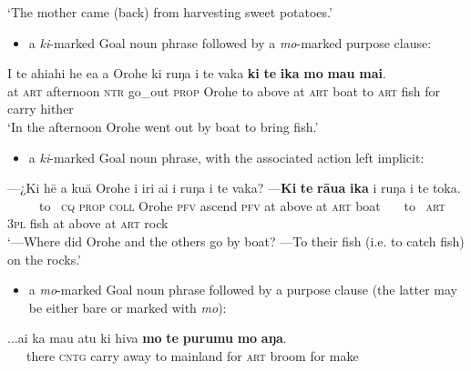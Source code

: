 \glt
‘The mother came (back) from harvesting sweet potatoes.’ \textstyleExampleref{[MsE-094.006]}
\z

\begin{itemize}
\item 
a \textit{ki}{}-marked Goal noun phrase followed by a \textit{mo}{}-marked purpose clause:
\end{itemize}

\ea\label{ex:11.251}
\gll {\ꞌ}I te ahiahi he e{\ꞌ}a a {\ꞌ}Orohe ki ruŋa i te vaka  \textbf{ki} \textbf{te} \textbf{ika} \textbf{mo} \textbf{ma{\ꞌ}u} \textbf{mai}.\\
at \textsc{art} afternoon \textsc{ntr} go\_out \textsc{prop} Orohe to above at \textsc{art} boat  to \textsc{art} fish for carry hither\\

\glt
‘In the afternoon Orohe went out by boat to bring fish.’ \textstyleExampleref{[R160.005]} 
\z

\begin{itemize}
\item 
a \textit{ki}{}-marked Goal noun phrase, with the associated action left implicit:
\end{itemize}

\ea\label{ex:11.252}
\gll —¿Ki hē a kuā {\ꞌ}Orohe i iri ai {\ꞌ}i ruŋa i te vaka?  —\textbf{Ki} \textbf{te} \textbf{rāua} \textbf{ika} {\ꞌ}i ruŋa i te toka.\\
~~~~~to~ \textsc{cq} \textsc{prop} \textsc{coll} Orohe \textsc{pfv} ascend \textsc{pfv} at above at \textsc{art} boat  ~~~to~ \textsc{art} \textsc{3pl} fish at above at \textsc{art} rock\\

\glt
‘—Where did Orohe and the others go by boat? —To their fish (i.e. to catch fish) on the rocks.’ \textstyleExampleref{[R154.038]}\textstyleExampleref{} 
\z

\begin{itemize}
\item 
a \textit{mo}{}-marked Goal noun phrase followed by a purpose clause (the latter may be either bare or marked with \textit{mo}):
\end{itemize}

\ea\label{ex:11.253}
\gll ...{\ꞌ}ai ka ma{\ꞌ}u atu ki hiva \textbf{mo} \textbf{te} \textbf{purumu} \textbf{mo} \textbf{aŋa}. \\
~~~there \textsc{cntg} carry away to mainland for \textsc{art} broom for make \\

